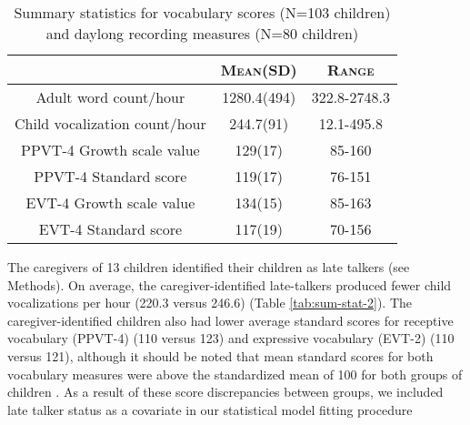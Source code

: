 \documentclass[a4paper,man,natbib,donotrepeattitle, apacite]{apa6}
\begin{document}
\begin{table}
\centering
\caption{\label{tab:sum-stat}Summary statistics for vocabulary scores (N=103 children) and 
daylong recording measures (N=80 children)}

\begin{tabular}{c | c | c } 
\hline
 & \textsc{Mean(SD)} & \textsc{Range} \\
\hline
\midrule

Adult word count/hour & 1280.4(494) & 322.8-2748.3 \\
Child vocalization count/hour & 244.7(91) & 12.1-495.8 \\
PPVT-4 Growth scale value & 129(17) & 85-160 \\
PPVT-4 Standard score & 119(17) & 76-151 \\
EVT-4 Growth scale value & 134(15) & 85-163 \\
EVT-4 Standard score & 117(19) & 70-156 \\


\bottomrule
\end{tabular}
\end{table}


The caregivers of 13 children identified their children as late talkers (see Methods). On average, the caregiver-identified late-talkers produced fewer child vocalizations per hour (220.3 versus 246.6) (Table \ref{tab:sum-stat-2}). The caregiver-identified children also had lower average standard scores  for receptive vocabulary (PPVT-4) (110 versus 123) and expressive vocabulary (EVT-2) (110 versus 121), although it should be noted that mean standard scores for both vocabulary measures were above the standardized mean of 100 for both groups of children . As a result of these score discrepancies between groups, we included late talker status as a covariate in our statistical model fitting procedure
\end{document}
